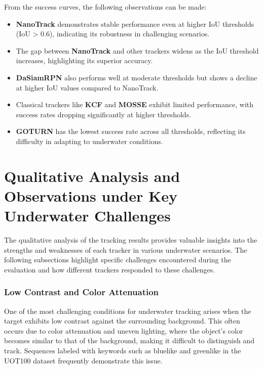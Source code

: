 From the success curves, the following observations can be made:
\begin{itemize}
    \item \textbf{NanoTrack} demonstrates stable performance even at higher IoU thresholds (IoU > 0.6), indicating its robustness in challenging scenarios.
    \item The gap between \textbf{NanoTrack} and other trackers widens as the IoU threshold increases, highlighting its superior accuracy.
    \item \textbf{DaSiamRPN} also performs well at moderate thresholds but shows a decline at higher IoU values compared to NanoTrack.
    \item Classical trackers like \textbf{KCF} and \textbf{MOSSE} exhibit limited performance, with success rates dropping significantly at higher thresholds.
    \item \textbf{GOTURN} has the lowest success rate across all thresholds, reflecting its difficulty in adapting to underwater conditions.
\end{itemize}

\section{Qualitative Analysis and Observations under Key Underwater Challenges}

The qualitative analysis of the tracking results provides valuable insights into the strengths and weaknesses of each tracker in various underwater scenarios. The following subsections highlight specific challenges encountered during the evaluation and how different trackers responded to these challenges.

\subsubsection{Low Contrast and Color Attenuation}
One of the most challenging conditions for underwater tracking arises when the target exhibits low contrast against the surrounding background. This often occurs due to color attenuation and uneven lighting, where the object's color becomes similar to that of the background, making it difficult to distinguish and track. Sequences labeled with keywords such as bluelike and greenlike in the UOT100 dataset frequently demonstrate this issue.

